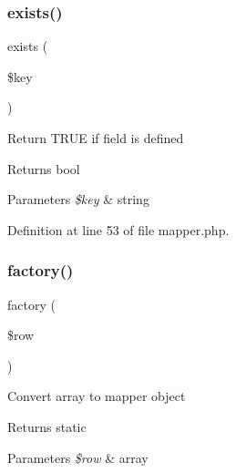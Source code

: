 \hypertarget{class_d_b_1_1_mongo_1_1_mapper_ace1ae5be37bf26c172cc7ea4e1a65e26}{}\label{class_d_b_1_1_mongo_1_1_mapper_ace1ae5be37bf26c172cc7ea4e1a65e26} 
\subsubsection{\texorpdfstring{exists()}{exists()}}
{\footnotesize\ttfamily exists (\begin{DoxyParamCaption}\item[{}]{\$key }\end{DoxyParamCaption})}

Return T\+R\+UE if field is defined \begin{DoxyReturn}{Returns}
bool 
\end{DoxyReturn}

\begin{DoxyParams}{Parameters}
{\em \$key} & string \\
\hline
\end{DoxyParams}


Definition at line 53 of file mapper.\+php.

\hypertarget{class_d_b_1_1_mongo_1_1_mapper_a60e4b1320f31f4049ad7867bd739c14d}{}\label{class_d_b_1_1_mongo_1_1_mapper_a60e4b1320f31f4049ad7867bd739c14d} 
\subsubsection{\texorpdfstring{factory()}{factory()}}
{\footnotesize\ttfamily factory (\begin{DoxyParamCaption}\item[{}]{\$row }\end{DoxyParamCaption})\hspace{0.3cm}{\ttfamily [protected]}}

Convert array to mapper object \begin{DoxyReturn}{Returns}
static 
\end{DoxyReturn}

\begin{DoxyParams}{Parameters}
{\em \$row} & array \\
\hline
\end{DoxyParams}


